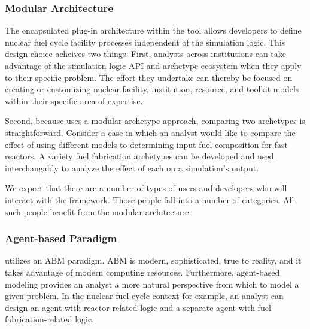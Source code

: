 \subsubsection{Modular Architecture}

The encapsulated plug-in architecture within the \Cyclus tool allows developers 
to define nuclear fuel cycle facility processes independent of the simulation 
logic. This design choice acheives two things. First, analysts across 
institutions can take advantage of the simulation logic \gls{API} and 
archetype ecosystem when they apply \Cyclus to their specific problem. The effort they 
undertake can thereby be focused on creating or customizing 
nuclear facility, institution, resource, and toolkit models within their 
specific area of expertise.

Second, because \Cyclus uses a modular archetype approach, comparing two 
archetypes is straightforward. Consider a case in which an analyst would like 
to compare the effect of using different models to determining input fuel 
composition for fast reactors. A variety fuel fabrication archetypes can be 
developed and used interchangably to analyze the effect of each on a 
simulation's output.

We expect that there are a number of types of users and developers who will 
interact with the \Cyclus framework. Those people fall into a number of 
categories. All such people benefit from the modular architecture. 

\subsubsection{Agent-based Paradigm}

\Cyclus utilizes an \gls{ABM} paradigm.  \gls{ABM} is modern, sophisticated, 
true to reality, and it takes advantage of modern computing resources. 
Furthermore, agent-based modeling provides an analyst a more natural 
perspective from which to model a given problem. In the nuclear fuel cycle 
context for example, an analyst can design an agent with reactor-related logic 
and a separate agent with fuel fabrication-related logic.  

